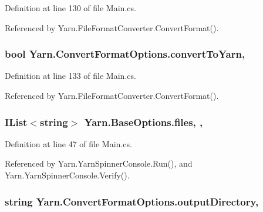Definition at line 130 of file Main.\-cs.



Referenced by Yarn.\-File\-Format\-Converter.\-Convert\-Format().

\hypertarget{a00052_a052d6f00647c503adc5a79a1ff92cdf4}{
\subsubsection[{convert\-To\-Yarn}]{\setlength{\rightskip}{0pt plus 5cm}bool Yarn.\-Convert\-Format\-Options.\-convert\-To\-Yarn\hspace{0.3cm}{\ttfamily [get]}, {\ttfamily [set]}}}\label{a00052_a052d6f00647c503adc5a79a1ff92cdf4}


Definition at line 133 of file Main.\-cs.



Referenced by Yarn.\-File\-Format\-Converter.\-Convert\-Format().

\hypertarget{a00035_aa93cbb1bc1d5328e0a417012621e92d2}{
\subsubsection[{files}]{\setlength{\rightskip}{0pt plus 5cm}I\-List$<$string$>$ Yarn.\-Base\-Options.\-files\hspace{0.3cm}{\ttfamily [get]}, {\ttfamily [set]}, {\ttfamily [inherited]}}}\label{a00035_aa93cbb1bc1d5328e0a417012621e92d2}


Definition at line 47 of file Main.\-cs.



Referenced by Yarn.\-Yarn\-Spinner\-Console.\-Run(), and Yarn.\-Yarn\-Spinner\-Console.\-Verify().

\hypertarget{a00052_ab636bde93c2204b2af1a9306560d9749}{
\subsubsection[{output\-Directory}]{\setlength{\rightskip}{0pt plus 5cm}string Yarn.\-Convert\-Format\-Options.\-output\-Directory\hspace{0.3cm}{\ttfamily [get]}, {\ttfamily [set]}}}\label{a00052_ab636bde93c2204b2af1a9306560d9749}


